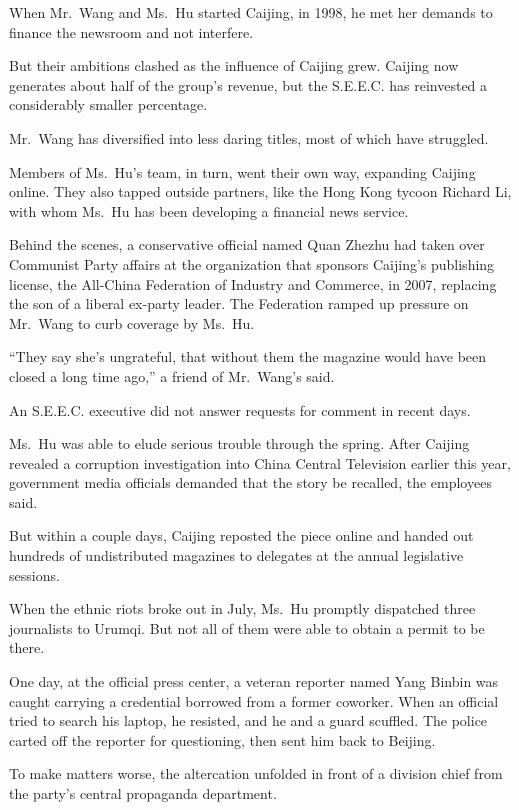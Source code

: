 ﻿\documentclass[12pt]{article}
\begin{document}
When Mr.~Wang and Ms.~Hu started Caijing, in 1998, he met her demands to finance the newsroom and
not interfere.

But their ambitions clashed as the influence of Caijing grew. Caijing now generates about half of
the group's revenue, but the S.E.E.C. has reinvested a considerably smaller percentage.

Mr.~Wang has diversified into less daring titles, most of which have struggled.

Members of Ms.~Hu's team, in turn, went their own way, expanding Caijing online. They also tapped
outside partners, like the Hong Kong tycoon Richard Li, with whom Ms.~Hu has been developing a
financial news service.

Behind the scenes, a conservative official named Quan Zhezhu had taken over Communist Party affairs
at the organization that sponsors Caijing's publishing license, the All-China Federation of Industry
and Commerce, in 2007, replacing the son of a liberal ex-party leader. The Federation ramped up
pressure on Mr.~Wang to curb coverage by Ms.~Hu.

``They say she's ungrateful, that without them the magazine would have been closed a long time
ago,'' a friend of Mr.~Wang's said.

An S.E.E.C. executive did not answer requests for comment in recent days.

Ms.~Hu was able to elude\cite{elude} serious trouble through the spring. After Caijing revealed a
corruption investigation into China Central Television earlier this year, government media officials
demanded that the story be recalled, the employees said.

But within a couple days, Caijing reposted the piece online and handed out hundreds of undistributed
magazines to delegates at the annual legislative sessions.

When the ethnic riots broke out in July, Ms.~Hu promptly dispatched three journalists to Urumqi. But
not all of them were able to obtain a permit to be there.

One day, at the official press center, a veteran reporter named Yang Binbin was caught carrying a
credential borrowed from a former coworker. When an official tried to search his laptop, he
resisted, and he and a guard scuffled. The police carted off the reporter for questioning, then sent
him back to Beijing.

To make matters worse, the altercation unfolded in front of a division chief from the party's
central propaganda department.
\end{document}
